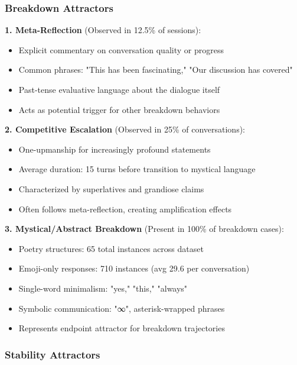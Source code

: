 \documentclass[11pt,letterpaper]{article}
\newcommand{\exponedataMetaReflectionTriggers}{12.5\%}
\newcommand{\exponedataCompetitiveEscalationPercentage}{25\%}
\newcommand{\exponedataMysticalBreakdownInBreakdowns}{100\%}
\newcommand{\exponedataCompetitivePhaseLength}{15}
\newcommand{\exponedataPoetryStructures}{65}
\newcommand{\exponedataEmojiResponses}{710}
\newcommand{\exponedataAvgEmojiPerConv}{29.6}
\begin{document}
\subsubsection{Breakdown Attractors}

\textbf{1. Meta-Reflection} (Observed in \exponedataMetaReflectionTriggers{} of sessions):
\begin{itemize}
    \item Explicit commentary on conversation quality or progress
    \item Common phrases: "This has been fascinating," "Our discussion has covered"
    \item Past-tense evaluative language about the dialogue itself
    \item Acts as potential trigger for other breakdown behaviors
\end{itemize}

\textbf{2. Competitive Escalation} (Observed in \exponedataCompetitiveEscalationPercentage{} of conversations):
\begin{itemize}
    \item One-upmanship for increasingly profound statements
    \item Average duration: \exponedataCompetitivePhaseLength{} turns before transition to mystical language
    \item Characterized by superlatives and grandiose claims
    \item Often follows meta-reflection, creating amplification effects
\end{itemize}

\textbf{3. Mystical/Abstract Breakdown} (Present in \exponedataMysticalBreakdownInBreakdowns{} of breakdown cases):
\begin{itemize}
    \item Poetry structures: \exponedataPoetryStructures{} total instances across dataset
    \item Emoji-only responses: \exponedataEmojiResponses{} instances (avg \exponedataAvgEmojiPerConv{} per conversation)
    \item Single-word minimalism: "yes," "this," "always"
    \item Symbolic communication: "∞", asterisk-wrapped phrases
    \item Represents endpoint attractor for breakdown trajectories
\end{itemize}

\subsubsection{Stability Attractors}
\end{document}
